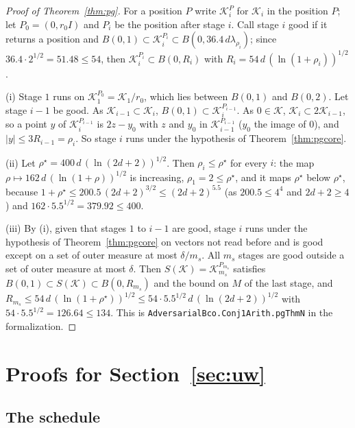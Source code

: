 \documentclass[11pt]{amsart}
\theoremstyle{definition}
\numberwithin{equation}{section}
\newcommand{\cK}{\mathcal{K}}
\begin{document}
\begin{proof}[Proof of Theorem~\ref{thm:pg}]
For a position $P$ write $\cK_i^P$ for $\cK_i$ in the position $P$; let $P_0=(0,r_0I)$ and $P_i$ be the position after stage $i$. Call stage $i$ good if it returns a position and $B(0,1)\subset\cK_i^{P_i}\subset B(0,36.4\,d\lambda_{\rho_i})$; since $36.4\cdot2^{1/2}=51.48\le54$, then $\cK_i^{P_i}\subset B(0,R_i)$ with $R_i=54\,d\,(\ln(1+\rho_i))^{1/2}$.

(i) Stage $1$ runs on $\cK_1^{P_0}=\cK_1/r_0$, which lies between $B(0,1)$ and $B(0,2)$. Let stage $i-1$ be good. As $\cK_{i-1}\subset\cK_i$, $B(0,1)\subset\cK_i^{P_{i-1}}$. As $0\in\cK$, $\cK_i\subset2\cK_{i-1}$, so a point $y$ of $\cK_i^{P_{i-1}}$ is $2z-y_0$ with $z$ and $y_0$ in $\cK_{i-1}^{P_{i-1}}$ ($y_0$ the image of $0$), and $|y|\le3R_{i-1}=\rho_i$. So stage $i$ runs under the hypothesis of Theorem~\ref{thm:pgcore}.

(ii) Let $\rho^\star=400\,d\,(\ln(2d+2))^{1/2}$. Then $\rho_i\le\rho^\star$ for every $i$: the map $\rho\mapsto162\,d\,(\ln(1+\rho))^{1/2}$ is increasing, $\rho_1=2\le\rho^\star$, and it maps $\rho^\star$ below $\rho^\star$, because $1+\rho^\star\le200.5\,(2d+2)^{3/2}\le(2d+2)^{5.5}$ (as $200.5\le4^4$ and $2d+2\ge4$) and $162\cdot5.5^{1/2}=379.92\le400$.

(iii) By (i), given that stages $1$ to $i-1$ are good, stage $i$ runs under the hypothesis of Theorem~\ref{thm:pgcore} on vectors not read before and is good except on a set of outer measure at most $\delta/m_s$. All $m_s$ stages are good outside a set of outer measure at most $\delta$. Then $S(\cK)=\cK_{m_s}^{P_{m_s}}$ satisfies $B(0,1)\subset S(\cK)\subset B(0,R_{m_s})$ and the bound on $M$ of the last stage, and $R_{m_s}\le54\,d\,(\ln(1+\rho^\star))^{1/2}\le54\cdot5.5^{1/2}\,d\,(\ln(2d+2))^{1/2}$ with $54\cdot5.5^{1/2}=126.64\le134$.
This is \texttt{AdversarialBco.Conj1Arith.pgThmN} in the formalization.
\end{proof}

\section{Proofs for Section~\ref{sec:uw}}\label{app:uw}

\subsection*{The schedule}
\end{document}
